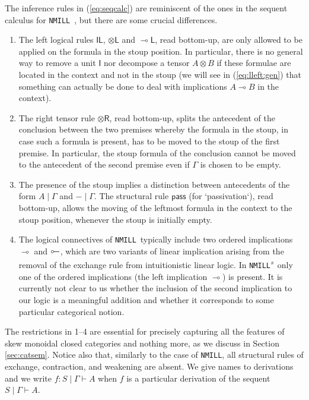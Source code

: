 \documentclass[submission,copyright,creativecommons]{eptcs}
\theoremstyle{definition}
\newcommand{\tl}{\otimes \mathsf{L}}
\newcommand{\tr}{\otimes \mathsf{R}}
\newcommand{\lleft}{{\multimap}\mathsf{L}}
\newcommand{\pass}{\mathsf{pass}}
\newcommand{\unitl}{\mathsf{IL}}
\newcommand{\ot}{\otimes}
\newcommand{\lolli}{\multimap}
\newcommand{\illol}{\rotatebox[origin=c]{180}{$\multimap$}}
\newcommand{\I}{\mathsf{I}}
\newcommand{\NMILL}{\texttt{NMILL}}
\newcommand{\SkNMILL}{\NMILL\textsuperscript{\textit{s}}}
\newcommand{\niccolo}[1]{{\color{red}\textbf{Niccol{\`o}: }#1}}
\begin{document}

The inference rules in (\ref{eq:seqcalc}) are reminiscent of the ones in the sequent calculus for \NMILL\ \cite{abrusci:noncommutative:1990}, but there are some crucial differences.
\begin{enumerate}
\item The left logical rules $\unitl$, $\tl$ and $\lleft$, read bottom-up, are only allowed to be applied on the formula in the stoup position. In particular, there is no general way to remove a unit $\I$ nor decompose a tensor $A \ot B$ if these formulae are located in the context and not in the stoup (we will see in (\ref{eq:lleft:gen}) that something can actually be done to deal with implications $A \lolli B$ in the context).
\item The right tensor rule $\tr$, read bottom-up, splits the antecedent of the conclusion between the two premises whereby the formula in the stoup, in case such a formula is present, has to be moved to the stoup of the first premise. In particular, the stoup formula of the conclusion cannot be moved to the antecedent of the second premise even if $\Gamma$ is chosen to be empty. 
\item The presence of the stoup implies a distinction between antecedents of the form $A \mid \Gamma$ and $- \mid \Gamma$. The structural rule $\pass$ (for `passivation`), read bottom-up, allows the moving of the leftmost formula in the context to the stoup position, whenever the stoup is initially empty.
\item The logical connectives of \NMILL\ typically include two ordered implications $\lolli$ and $\illol$, which are two variants of linear implication arising from the removal of the exchange rule from intuitionistic linear logic. In \SkNMILL\ only one of the ordered implications (the left implication $\lolli$) is present. It is currently not clear to us whether the inclusion of the second implication to our logic is a meaningful addition and whether it corresponds to some particular categorical notion.
\end{enumerate}
The restrictions in 1--4 are essential for precisely capturing all the features of skew monoidal closed categories and nothing more, as we discuss in Section \ref{sec:catsem}.
Notice also that, similarly to the case of \NMILL, all structural rules of exchange, contraction, and weakening are absent. We give names to derivations and we write $f : S \mid \Gamma \vdash A$ when $f$ is a particular derivation of the sequent $S \mid \Gamma \vdash A$.
\end{document}
